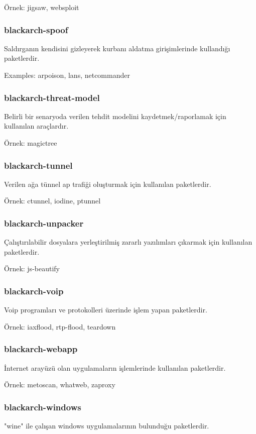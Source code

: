 \documentclass[a4paper, oneside, 11pt]{book}
\begin{document}
Örnek: jigsaw, websploit

\subsubsection{blackarch-spoof}
Saldırganın kendisini gizleyerek kurbanı aldatma girişimlerinde kullandığı paketlerdir.

Examples: arpoison, lans, netcommander

\subsubsection{blackarch-threat-model}
Belirli bir senaryoda verilen tehdit modelini kaydetmek/raporlamak için kullanılan araçlardır.

Örnek: magictree

\subsubsection{blackarch-tunnel}
Verilen ağa tünnel ap trafiği oluşturmak için kullanılan paketlerdir.

Örnek: ctunnel, iodine, ptunnel

\subsubsection{blackarch-unpacker}
Çalıştırılabilir dosyalara yerleştirilmiş zararlı yazılımları çıkarmak için kullanılan paketlerdir.

Örnek: js-beautify

\subsubsection{blackarch-voip}
Voip programları ve protokolleri üzerinde işlem yapan paketlerdir.

Örnek: iaxflood, rtp-flood, teardown

\subsubsection{blackarch-webapp}
İnternet arayüzü olan uygulamaların işlemlerinde kullanılan paketlerdir.

Örnek: metoscan, whatweb, zaproxy

\subsubsection{blackarch-windows}
"wine" ile çalışan windows uygulamalarının bulunduğu paketlerdir.
\end{document}
